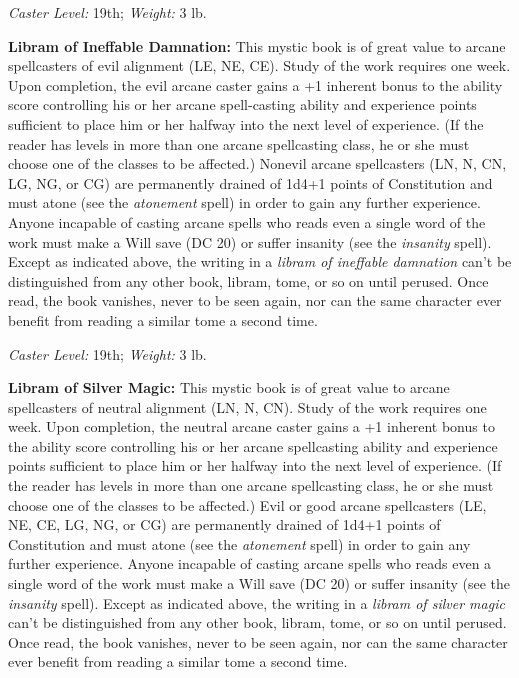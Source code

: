 \documentclass{article}
\begin{document}
\textit{Caster Level: }19th; \textit{Weight: }3 lb. 

\textbf{Libram of Ineffable Damnation: }This mystic book is of great value to arcane 
spellcasters of evil alignment (LE, NE, CE). Study of the work requires one week. 
Upon completion, the evil arcane caster gains a +1 inherent bonus to the ability 
score controlling his or her arcane spell-casting ability and experience points 
sufficient to place him or her halfway into the next level of experience. (If the 
reader has levels in more than one arcane spellcasting class, he or she must choose 
one of the classes to be affected.) Nonevil arcane spellcasters (LN, N, CN, LG, 
NG, or CG) are permanently drained of 1d4+1 points of Constitution and must atone 
(see the \textit{atonement }spell) in order to gain any further experience. Anyone 
incapable of casting arcane spells who reads even a single word of the work must 
make a Will save (DC 20) or suffer insanity (see the \textit{insanity }spell). 
Except as indicated above, the writing in a \textit{libram of ineffable damnation 
}can't be distinguished from any other book, libram, tome, or so on until perused. 
Once read, the book vanishes, never to be seen again, nor can the same character 
ever benefit from reading a similar tome a second time. 

\textit{Caster Level: }19th; \textit{Weight: }3 lb. 

\textbf{Libram of Silver Magic: }This mystic book is of great value to arcane spellcasters 
of neutral alignment (LN, N, CN). Study of the work requires one week. Upon completion, 
the neutral arcane caster gains a +1 inherent bonus to the ability score controlling 
his or her arcane spellcasting ability and experience points sufficient to place 
him or her halfway into the next level of experience. (If the reader has levels 
in more than one arcane spellcasting class, he or she must choose one of the classes 
to be affected.) Evil or good arcane spellcasters (LE, NE, CE, LG, NG, or CG) are 
permanently drained of 1d4+1 points of Constitution and must atone (see the \textit{atonement 
}spell) in order to gain any further experience. Anyone incapable of casting arcane 
spells who reads even a single word of the work must make a Will save (DC 20) or 
suffer insanity (see the \textit{insanity }spell). Except as indicated above, the 
writing in a \textit{libram of silver magic }can't be distinguished from any other 
book, libram, tome, or so on until perused. Once read, the book vanishes, never 
to be seen again, nor can the same character ever benefit from reading a similar 
tome a second time. 
\end{document}
